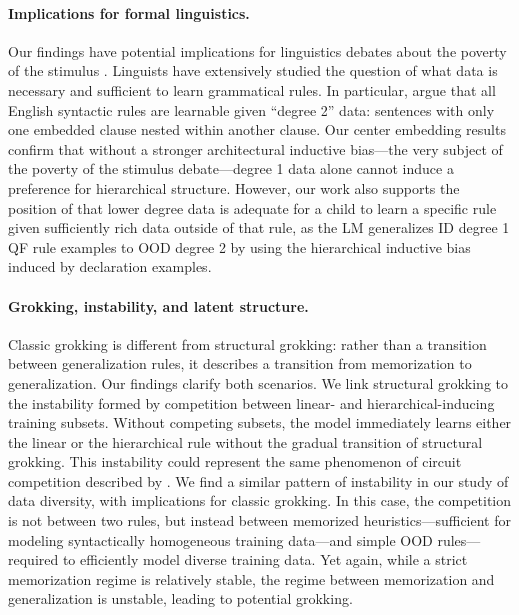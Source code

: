 \paragraph{Implications for formal linguistics.}
Our findings have potential implications for linguistics debates about the poverty of the stimulus \citep{McCoy2018-uv, Berwick2011-xb}. Linguists have extensively studied the question of what data is necessary and sufficient to learn grammatical rules. In particular, \citet{wexler1980formal} argue that all English syntactic rules are learnable given ``degree 2'' data: sentences with only one embedded clause nested within another clause. Our center embedding results confirm that without a stronger architectural inductive bias---the very subject of the poverty of the stimulus debate---degree 1 data alone cannot induce a preference for hierarchical structure. However, our work also supports the position of \citet{lightfoot1989child} that lower degree data is adequate for a child to learn a specific rule given sufficiently rich data outside of that rule, as the LM generalizes ID degree 1 QF rule examples to OOD degree 2 by using the hierarchical inductive bias induced by declaration examples. 

\paragraph{Grokking, instability, and latent structure.}
Classic grokking \citep{Power2022-hz} is different from structural grokking: rather than a transition between generalization rules, it describes a transition from memorization to generalization. Our findings clarify both scenarios. 
We link structural grokking to the instability formed by competition between linear- and hierarchical-inducing training subsets. Without competing subsets, the model immediately learns either the linear or the hierarchical rule without the gradual transition of structural grokking. This instability could represent the same phenomenon of circuit competition described by \citet{Ahuja2024-ul}.
We find a similar pattern of instability in our study of data diversity, with implications for classic grokking. In this case, the competition is not between two rules, but instead between memorized heuristics---sufficient for modeling syntactically homogeneous training data---and simple OOD rules---required to efficiently model diverse training data. Yet again, while a strict memorization regime is relatively stable, the regime between memorization and generalization is unstable, leading to potential grokking.

